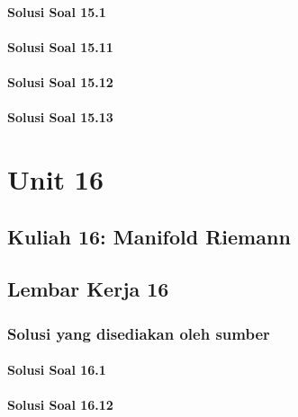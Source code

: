 \documentclass[11pt,a4paper,oneside]{book}
\begin{document}
\subsection*{Solusi Soal 15.1}

\subsection*{Solusi Soal 15.11}

\subsection*{Solusi Soal 15.12}

\subsection*{Solusi Soal 15.13}


\part{Unit 16}
\chapter[Kuliah 16]{Kuliah 16: Manifold Riemann}


\chapter{Lembar Kerja 16}


\section*{Solusi yang disediakan oleh sumber}
\subsection*{Solusi Soal 16.1}

\subsection*{Solusi Soal 16.12}

\end{document}
